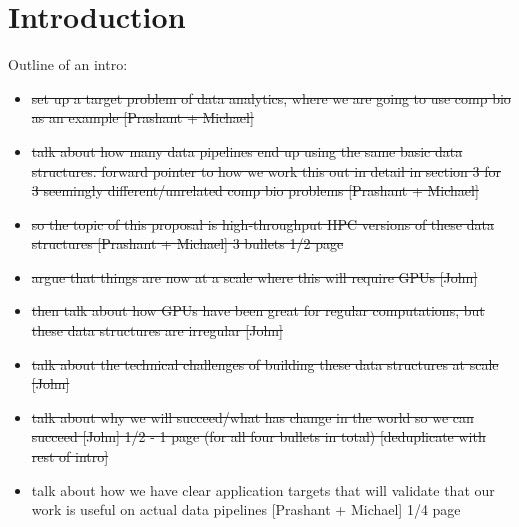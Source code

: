 


\section{Introduction}
\label{intro}




{\color{blue} Outline of an intro:
\begin{itemize}
    \item \sout{set up a target problem of data analytics, where we are going to use comp bio as an example [Prashant + Michael]}
    \item \sout{talk about how many data pipelines end up using the same basic data structures.  forward pointer to how we work this out in detail in section 3 for 3 seemingly different/unrelated comp bio problems [Prashant + Michael]}
    \item \sout{so the topic of this proposal is high-throughput HPC versions of these data structures [Prashant + Michael] 3 bullets 1/2 page}
    \item \sout{argue that things are now at a scale where this will require GPUs [John]}
    \item \sout{then talk about how GPUs have been great for regular computations, but these data structures are irregular [John]}
    \item \sout{talk about the technical challenges of building these data structures at scale [John]}
    \item \sout{talk about why we will succeed/what has change in the world so we can succeed [John] 1/2 - 1 page (for all four bullets in total) [deduplicate with rest of intro]}
    \item talk about how we have clear application targets that will validate that our work is useful on actual data pipelines [Prashant + Michael] 1/4 page
\end{itemize}
}

